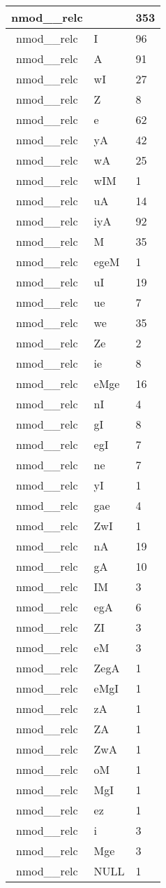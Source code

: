 \documentclass[a4 paper]{article}
\begin{document}
\begin{longtable}{cp{}p{}}
nmod\_\_relc &  & 353\\ \midrule nmod\_\_relc & I & 96\\ \midrule nmod\_\_relc & A & 91\\ \midrule nmod\_\_relc & wI & 27\\ \midrule nmod\_\_relc & Z & 8\\ \midrule nmod\_\_relc & e & 62\\ \midrule nmod\_\_relc & yA & 42\\ \midrule nmod\_\_relc & wA & 25\\ \midrule nmod\_\_relc & wIM & 1\\ \midrule nmod\_\_relc & uA & 14\\ \midrule nmod\_\_relc & iyA & 92\\ \midrule nmod\_\_relc & M & 35\\ \midrule nmod\_\_relc & egeM & 1\\ \midrule nmod\_\_relc & uI & 19\\ \midrule nmod\_\_relc & ue & 7\\ \midrule nmod\_\_relc & we & 35\\ \midrule nmod\_\_relc & Ze & 2\\ \midrule nmod\_\_relc & ie & 8\\ \midrule nmod\_\_relc & eMge & 16\\ \midrule nmod\_\_relc & nI & 4\\ \midrule nmod\_\_relc & gI & 8\\ \midrule nmod\_\_relc & egI & 7\\ \midrule nmod\_\_relc & ne & 7\\ \midrule nmod\_\_relc & yI & 1\\ \midrule nmod\_\_relc & gae & 4\\ \midrule nmod\_\_relc & ZwI & 1\\ \midrule nmod\_\_relc & nA & 19\\ \midrule nmod\_\_relc & gA & 10\\ \midrule nmod\_\_relc & IM & 3\\ \midrule nmod\_\_relc & egA & 6\\ \midrule nmod\_\_relc & ZI & 3\\ \midrule nmod\_\_relc & eM & 3\\ \midrule nmod\_\_relc & ZegA & 1\\ \midrule nmod\_\_relc & eMgI & 1\\ \midrule nmod\_\_relc & zA & 1\\ \midrule nmod\_\_relc & ZA & 1\\ \midrule nmod\_\_relc & ZwA & 1\\ \midrule nmod\_\_relc & oM & 1\\ \midrule nmod\_\_relc & MgI & 1\\ \midrule nmod\_\_relc & ez & 1\\ \midrule nmod\_\_relc & i & 3\\ \midrule nmod\_\_relc & Mge & 3\\ \midrule nmod\_\_relc & NULL & 1\\ \midrule 

\end{longtable}
\end{document}
